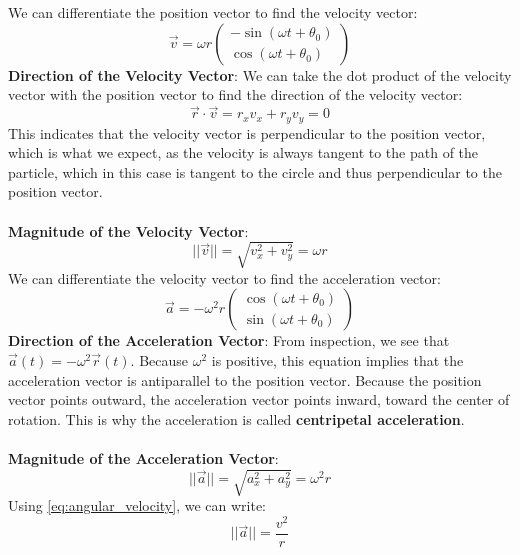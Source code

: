 \documentclass[article, 11pt]{article}
\theoremstyle{definition}
\begin{document}
    \\
    \\
    We can differentiate the position vector to find the velocity vector:
    \begin{equation}
        \vec{v} = \omega r \begin{pmatrix} -\sin(\omega t + \theta_0) \\ \cos(\omega t + \theta_0) \end{pmatrix}
    \end{equation}
    \textbf{Direction of the Velocity Vector}: We can take the dot product of the velocity vector with the position vector to find the direction of the velocity vector:
    \begin{equation}
        \vec{r} \cdot \vec{v} = r_x v_x + r_y v_y = 0
    \end{equation}
    This indicates that the velocity vector is perpendicular to the position vector, which is what we expect, as the velocity is always tangent to the path of the particle, which in this case is tangent to the circle and thus perpendicular to the position vector.
    \\
    \\
    \textbf{Magnitude of the Velocity Vector}: 
    \begin{equation}
        ||\vec{v}|| = \sqrt{v_x^2 + v_y^2} = \omega r
        \label{eq:angular_velocity}
    \end{equation}
    We can differentiate the velocity vector to find the acceleration vector:
    \begin{equation}
        \vec{a} = -\omega^2 r \begin{pmatrix} \cos(\omega t + \theta_0) \\ \sin(\omega t + \theta_0) \end{pmatrix}
    \end{equation}
    \textbf{Direction of the Acceleration Vector}: From inspection, we see that $\vec{a}(t) = -\omega^2 \vec{r}(t)$. Because $\omega^2$ is positive, this equation implies that the acceleration vector is antiparallel to the position vector. Because the position vector points outward, the acceleration vector points inward, toward the center of rotation. This is why the acceleration is called \textbf{centripetal acceleration}.
    \\
    \\
    \textbf{Magnitude of the Acceleration Vector}:
    \begin{equation}
        ||\vec{a}|| = \sqrt{a_x^2 + a_y^2} = \omega^2 r
    \end{equation}
    Using \autoref{eq:angular_velocity}, we can write:
    \begin{equation}
        ||\vec{a}|| = \frac{v^2}{r}
    \end{equation}
\end{document}

